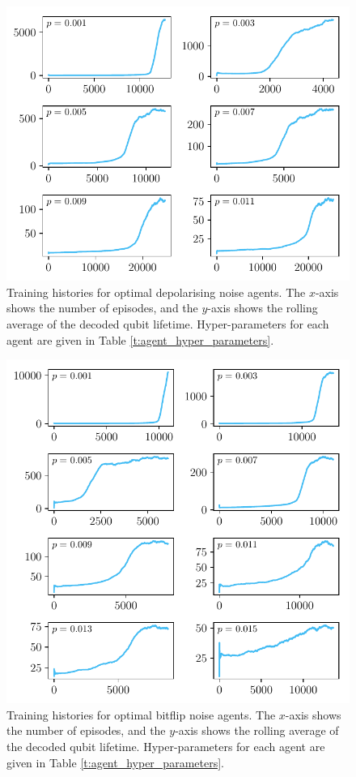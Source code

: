 \documentclass[twocolumn,preprintnumbers,amsmath,amssymb,notitlepage,nofootinbib,longbibliography,superscriptaddress,aps,pra,10pt]{revtex4-1}
\begin{document}
	\begin{figure}
		\centering
		\includegraphics[width=\linewidth]{figures/depolarising_histories.pdf}
		\caption{Training histories for optimal depolarising noise agents. The $x$-axis shows the number of episodes, and the $y$-axis shows the rolling average of the decoded qubit lifetime. Hyper-parameters for each agent are given in Table \ref{t:agent_hyper_parameters}.}\label{f:training_results_dp}
	\end{figure}

	\begin{figure}
		\centering{}
		\includegraphics[width=\linewidth]{figures/bitflip_histories.pdf}
		\caption{Training histories for optimal bitflip noise agents. The $x$-axis shows the number of episodes, and the $y$-axis shows the rolling average of the decoded qubit lifetime. Hyper-parameters for each agent are given in Table \ref{t:agent_hyper_parameters}.}\label{f:training_results_x}
	\end{figure}

\clearpage


\end{document}
